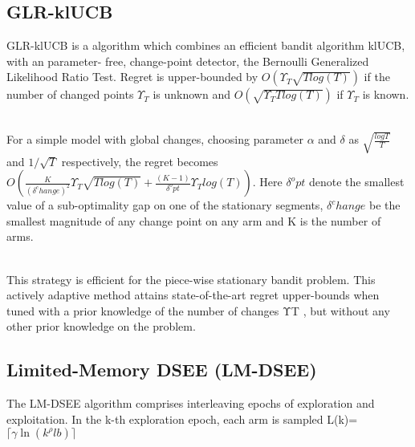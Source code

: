 \subsection{GLR-klUCB}\label{subsec:glr-klucb}
GLR-klUCB is a algorithm which combines an efficient bandit algorithm klUCB, with an parameter- free, change-point detector, the Bernoulli Generalized Likelihood Ratio Test.
Regret is upper-bounded by $ O(\Upsilon_T \sqrt{T log(T)} )$ if the number of changed points $\Upsilon_T $ is unknown and $ O(\sqrt{\Upsilon_T T log(T)} )$ if  $\Upsilon_T $ is known.\citep{Besson2019}


\\For a simple model with global changes, choosing parameter $\alpha$ and $\delta $ as $\sqrt{\frac{logT}{T}}$ and $1/\sqrt{T}$ respectively, the regret becomes $O(\frac{K}{(\delta^change)^2} \Upsilon_T \sqrt{T log(T)}+\frac{(K-1)}{\delta^opt} \Upsilon_T log(T))$. Here $\delta^opt$ denote the smallest value of a sub-optimality gap on one of the stationary segments, $\delta^change$ be the smallest magnitude of any change point on any arm and K is the number of arms.
\citep{Besson2019}


\\This strategy is efficient for the piece-wise stationary bandit problem. This actively adaptive method attains state-of-the-art regret upper-bounds when tuned with a prior knowledge of the number of changes ΥT , but without any other prior knowledge on the problem.\citep{Besson2019}

\subsection{ Limited-Memory DSEE (LM-DSEE)}
The LM-DSEE algorithm comprises interleaving epochs of exploration and exploitation. In the k-th exploration epoch, each arm is sampled L(k)=$\lceil\gamma\ln({k^{\rho}lb})\rceil$

